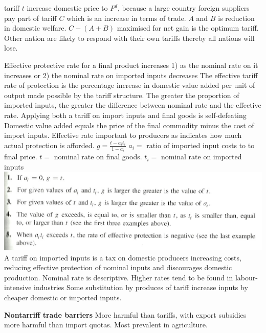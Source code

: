 \documentclass[12pt]{examnotes}
\begin{document}
\ra tariff $t$ increase domestic price to $P^d$, because a large country foreign suppliers pay part of tariff $C$ which is an increase in terms of trade. $A$ and $B$ is reduction in domestic welfare. $C -(A+B)$ maximised for net gain is the optimum tariff. 
\ra Other nation are likely to respond with their own tariffs thereby all nations will lose.

\ra Effective protective rate for a final product increases 1) as the nominal rate on it increases or 2) the nominal rate on imported inputs decreases
\ra The effective tariff rate of protection is the percentage increase in domestic value added per unit of output made possible by the tariff structure.
\ra The greater the proportion of imported inputs, the greater the difference between nominal rate and the effective rate. 
\ra Applying both a tariff on import inputs and final goods is self-defeating 
\ra Domestic value added equals the price of the final commodity minus the cost of import inputs.
\ra Effective rate  important to producers as indicates how much actual protection is afforded.
\ra $g=\displaystyle\frac{t-a_it_i}{1-a_i}$ $a_i=$ ratio of imported input costs to to final price. $t=$ nominal rate on final goods. $t_i=$ nominal rate on imported inputs 
\includegraphics[scale=0.5]{./imgs/53.jpg}
\ra A tariff on imported inputs is a tax on domestic producers increasing costs, reducing effective protection of nominal inputs and discourages domestic production.
\ra Nominal rate is descriptive.
\ra Higher rates tend to be found in labour-intensive industries
\ra Some substitution by produces of tariff increase inputs by cheaper domestic or imported inputs.


\vspace{6pt}
\vspace{6pt}
{\bf \Large Nontarriff trade barriers}
\ra More harmful than tariffs, with export subsidies more harmful than import quotas.
\ra Most prevalent in agriculture.
\end{document}
